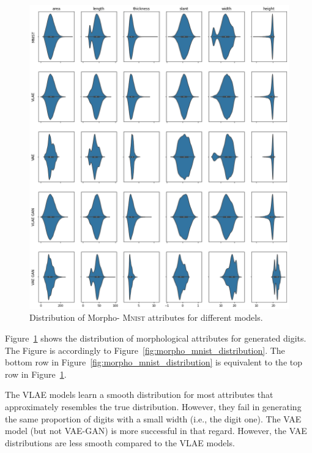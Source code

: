 \begin{figure}
    \centering
    \includegraphics[width=\textwidth]{images/generated_vs_true/mnist/morpho_distr.png}
    \caption{Distribution of Morpho- \textsc{Mnist} attributes for different models.}
    \label{fig:generated_morpho_distribution}
\end{figure}

Figure~\ref{fig:generated_morpho_distribution} shows the distribution of morphological attributes for generated digits.
The Figure is accordingly to Figure~\ref{fig:morpho_mnist_distribution}.
The bottom row in Figure~\ref{fig:morpho_mnist_distribution} is equivalent to the top row in Figure~\ref{fig:generated_morpho_distribution}.

The \ac{VLAE} models learn a smooth distribution for most attributes that approximately resembles the true distribution.
However, they fail in generating the same proportion of digits with a small width (i.e., the digit one).
The \ac{VAE} model (but not \ac{VAE}-\ac{GAN}) is more successful in that regard.
However, the \ac{VAE} distributions are less smooth compared to the \ac{VLAE} models.

